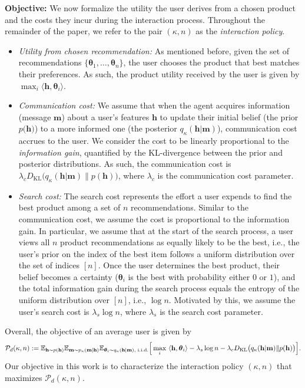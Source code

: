 \documentclass[12pt]{article}
\theoremstyle{definition}
\theoremstyle{remark}
\begin{document}
\noindent \textbf{Objective:} We now formalize the utility the user derives from a chosen product and the costs they incur during the interaction process. Throughout the remainder of the paper, we refer to the pair $(\kappa,n)$ as the \textit{interaction policy}.
\begin{itemize}
    \item[(i)]

    \textit{Utility from chosen recommendation:} As mentioned before, given the set of recommendations $\{\boldsymbol\theta_1, \dots, \boldsymbol \theta_n\}$, the user chooses the product that best matches their preferences. As such, the product utility received by the user is given by $\max_i \langle \mathbf h , \boldsymbol \theta_i \rangle$.

    \item[(ii)]
    \textit{Communication cost:}
    We assume that when the agent acquires information (message $\mathbf{m}$) about a user's features $\mathbf{h}$ to update their initial belief (the prior $p(\mathbf{h)}$) to a more informed one (the posterior $q_{\kappa}(\mathbf{h}|\mathbf{m})$), communication cost accrues to the user. We consider the cost to be linearly proportional to the \textit{information gain}, quantified by the KL-divergence between the prior and posterior distributions. As such, the communication cost is $\lambda_c D_{\mathrm{KL}}\big(q_{\kappa}(\mathbf{h}|\mathbf{m}) \| p(\mathbf{h})\big)$, where $\lambda_c$ is the communication cost parameter.

    \item[(iii)]
    \textit{Search cost:}  The search cost represents the effort a user expends to find the best product among a set of $n$ recommendations. Similar to the communication cost, we assume the cost is proportional to the information gain.
    In particular, we assume that at the start of the search process, a user views all $n$ product recommendations as equally likely to be the best, i.e., the user's prior on the index of the best item follows a uniform distribution over the set of indices $[n]$. Once the user determines the best product, their belief becomes a certainty ($\boldsymbol \theta_i$ is the best with probability either $0$ or $1$), and the total information gain during the search process equals the entropy of the uniform distribution over $[n]$, i.e., $\log n$. Motivated by this, we assume the user's search cost is $\lambda_s \log n$, where $\lambda_s$ is the search cost parameter.
\end{itemize}
Overall, the objective of an average user is given by
\begin{align*}
    \mathcal{P}_d(\kappa,n) := \mathbb E_{\mathbf h \sim p(\mathbf h)} \mathbb E_{\mathbf m \sim p_\kappa (\mathbf m | \mathbf{h})}\mathbb E_{\boldsymbol \theta_i \sim q_\kappa (\mathbf h | \mathbf{m}),  \textup{ i.i.d.}}\Big[ \max_{i} \ \langle \mathbf h , \boldsymbol \theta_i \rangle - \lambda_s \log n - \lambda_c D_{\mathrm{KL}}\big(q_{\kappa}(\mathbf{h}|\mathbf{m}) \| p(\mathbf{h})\big) \Big].
\end{align*}
Our objective in this work is to characterize the interaction policy $(\kappa, n)$ that maximizes $\mathcal{P}_d(\kappa,n)$.
\end{document}
